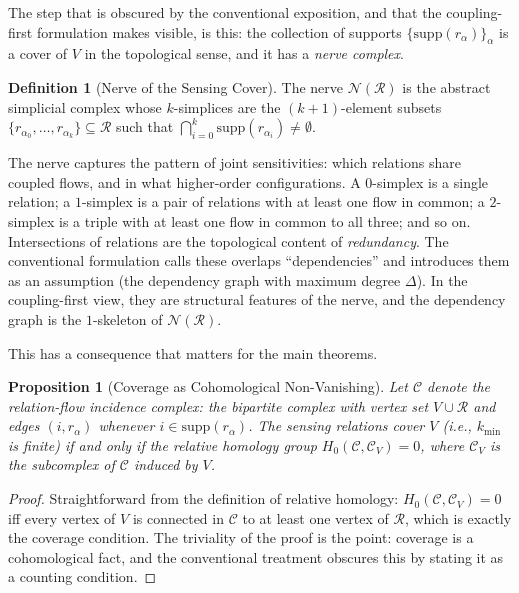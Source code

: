 \documentclass[11pt]{article}
\newtheorem{proposition}[theorem]{Proposition}
\theoremstyle{definition}
\newtheorem{definition}[theorem]{Definition}
\theoremstyle{remark}
\begin{document}
The step that is obscured by the conventional exposition, and that the coupling-first formulation makes visible, is this: the collection of supports $\{\mathrm{supp}(r_\alpha)\}_\alpha$ is a cover of $V$ in the topological sense, and it has a \emph{nerve complex}.

\begin{definition}[Nerve of the Sensing Cover]
The nerve $\mathcal{N}(\mathcal{R})$ is the abstract simplicial complex whose $k$-simplices are the $(k+1)$-element subsets $\{r_{\alpha_0}, \ldots, r_{\alpha_k}\} \subseteq \mathcal{R}$ such that $\bigcap_{i=0}^{k} \mathrm{supp}(r_{\alpha_i}) \neq \emptyset$.
\end{definition}

The nerve captures the pattern of joint sensitivities: which relations share coupled flows, and in what higher-order configurations. A $0$-simplex is a single relation; a $1$-simplex is a pair of relations with at least one flow in common; a $2$-simplex is a triple with at least one flow in common to all three; and so on. Intersections of relations are the topological content of \emph{redundancy}. The conventional formulation calls these overlaps ``dependencies'' and introduces them as an assumption (the dependency graph with maximum degree $\Delta$). In the coupling-first view, they are structural features of the nerve, and the dependency graph is the $1$-skeleton of $\mathcal{N}(\mathcal{R})$.

This has a consequence that matters for the main theorems.

\begin{proposition}[Coverage as Cohomological Non-Vanishing]
\label{prop:coverage-cohomology}
Let $\mathcal{C}$ denote the relation-flow incidence complex: the bipartite complex with vertex set $V \cup \mathcal{R}$ and edges $(i, r_\alpha)$ whenever $i \in \mathrm{supp}(r_\alpha)$. The sensing relations cover $V$ (i.e., $k_{\min}$ is finite) if and only if the relative homology group $H_0(\mathcal{C}, \mathcal{C}_V) = 0$, where $\mathcal{C}_V$ is the subcomplex of $\mathcal{C}$ induced by $V$.
\end{proposition}

\begin{proof}
Straightforward from the definition of relative homology: $H_0(\mathcal{C}, \mathcal{C}_V) = 0$ iff every vertex of $V$ is connected in $\mathcal{C}$ to at least one vertex of $\mathcal{R}$, which is exactly the coverage condition. The triviality of the proof is the point: coverage is a cohomological fact, and the conventional treatment obscures this by stating it as a counting condition.
\end{proof}
\end{document}
